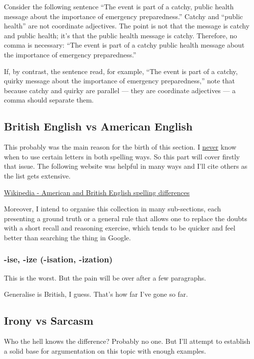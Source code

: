 Consider the following sentence ``The event is part of a catchy, public health message about the importance of emergency preparedness.''
Catchy and ``public health'' are not coordinate adjectives. The point is not that the message is catchy and public health; it's that the public health message is catchy. Therefore, no comma is necessary: ``The event is part of a catchy public health message about the importance of emergency preparedness.''

If, by contrast, the sentence read, for example, ``The event is part of a catchy, quirky message about the importance of emergency preparedness,'' note that because catchy and quirky are parallel — they are coordinate adjectives — a comma should separate them.



\subsection{British English vs American English}

This probably was the main reason for the birth of this section. I \ul{never} know when to use certain letters in both spelling ways. So this part will cover firstly that issue. The following website was helpful in many ways and I'll cite others as the list gets extensive.

\href{https://en.wikipedia.org/wiki/American_and_British_English_spelling_differences}{\ul{Wikipedia - American and British English spelling differences}}

Moreover, I intend to organise this collection in many sub-sections, each presenting a ground truth or a general rule that allows one to replace the doubts with a short recall and reasoning exercise, which tends to be quicker and feel better than searching the thing in Google.


\subsubsection{-ise, -ize (-isation, -ization)}
This is the worst. But the pain will be over after a few paragraphs.

Generalise is British, I guess. That's how far I've gone so far.




\subsection{Irony vs Sarcasm}
Who the hell knows the difference? Probably no one. But I'll attempt to establish a solid base for argumentation on this topic with enough examples.



